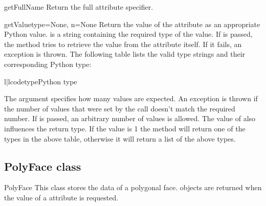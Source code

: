 \begin{methoddesc}{getFullName}{}
Return the full attribute specifier.
\end{methoddesc}

\begin{methoddesc}{getValue}{type=None, n=None}
\label{AttributeGetValue}
Return the value of the attribute as an appropriate Python value.
 is a string containing the required type of the value.
If  is passed, the method tries to retrieve the value from
the attribute itself. If it fails, an exception is thrown. The following
table lists the valid type strings and their corresponding Python type:

\begin{tableii}{l|l}{code}{type}{Python type}
\end{tableii}

The argument  specifies how many values are expected. An exception
is thrown if the number of values that were set by the  call
doesn't match the required number. If  is passed, an arbitrary
number of values is allowed. The value of  also influences the
return type. If the value is 1 the method will return one of the types
in the above table, otherwise it will return a list of the above types.

\end{methoddesc}

\subsection{PolyFace class}
\label{polyface}

\begin{classdesc*}{PolyFace}
This class stores the data of a polygonal face.  objects
are returned when the value of a  attribute is requested.
\end{classdesc*}

